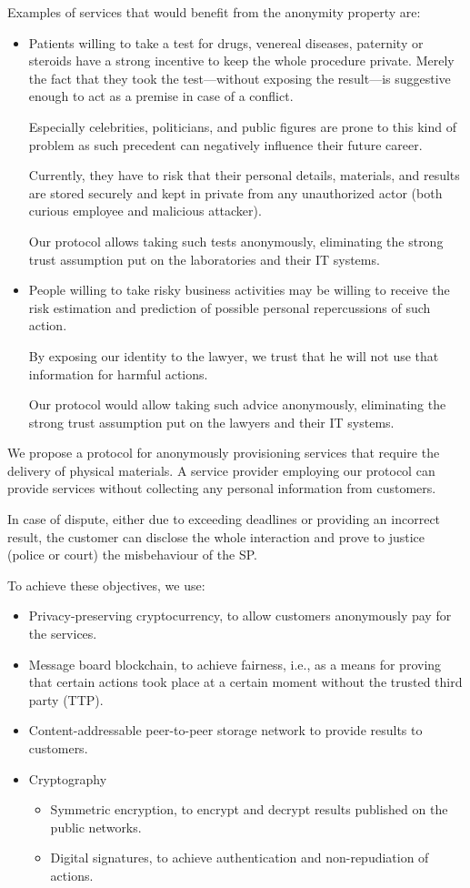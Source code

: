 \documentclass{ieeeaccess}
\begin{document}
Examples of services that would benefit from the anonymity property are:
\begin{itemize}
    \item Patients willing to take a test for drugs, venereal diseases, paternity or steroids have a strong incentive to keep the whole procedure private. Merely the fact that they took the test—without exposing the result—is suggestive enough to act as a premise in case of a conflict.

Especially celebrities, politicians, and public figures are prone to this kind of problem as such precedent can negatively influence their future career.

Currently, they have to risk that their personal details, materials, and results are stored securely and kept in private from any unauthorized actor (both curious employee and malicious attacker).

Our protocol allows taking such tests anonymously, eliminating the strong trust assumption put on the laboratories and their IT
systems.
\item People willing to take risky business activities may be willing to receive the risk estimation and prediction of possible personal repercussions of such action.

By exposing our identity to the lawyer, we trust that he will not use that
information for harmful actions.

Our protocol would allow taking such advice anonymously, eliminating the strong trust assumption put on the lawyers and their IT systems.
\end{itemize}

We propose a protocol for anonymously provisioning services that require the delivery of physical materials. A service provider employing our protocol can provide services without collecting any personal information from customers.

In case of dispute, either due to exceeding deadlines or providing an  incorrect result, the customer can disclose the whole interaction and
prove to justice (police or court) the misbehaviour of the SP.

To achieve these objectives, we use:
\begin{itemize}
    \item Privacy-preserving cryptocurrency, to allow customers anonymously pay for the services.
    \item Message board blockchain, to achieve fairness, i.e., as a means for proving that certain actions took place at a certain moment without the trusted third party (TTP).
    \item Content-addressable peer-to-peer storage network to provide results to customers. 
    \item Cryptography
    \begin{itemize}
        \item Symmetric encryption, to encrypt and decrypt results published on the public networks.
        \item Digital signatures, to achieve authentication and non-repudiation of actions. 
    \end{itemize}
    
\end{itemize}
\end{document}
